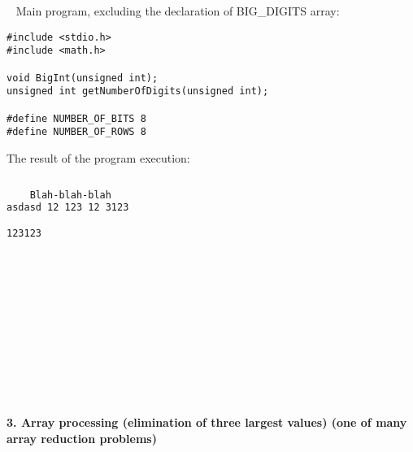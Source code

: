 \documentclass{article}
\begin{document}
	\rmfamily\
	\newline
	\noindent Main program, excluding the declaration of BIG_DIGITS array:
	
	\begin{verbatim}
#include <stdio.h>
#include <math.h>

void BigInt(unsigned int);
unsigned int getNumberOfDigits(unsigned int);

#define NUMBER_OF_BITS 8
#define NUMBER_OF_ROWS 8
	\end{verbatim}
	
	
	\noindent The result of the program execution:
	
	\begin{lstlisting}[basicstyle=\fontsize{7}{9}\ttfamily, language=bash]%[basicstyle=\tiny, %or \small or \footnotesize etc.]
	
	Blah-blah-blah
asdasd 12 123 12 3123 

123123

	\end{lstlisting}
	
	
\paragraph{}\
\paragraph{}\
\paragraph{}\
\paragraph{}\
\paragraph{}\


	
	\rmfamily
	
	\paragraph{3. Array processing (elimination of three largest values) (one of many array reduction problems) }\
	
	\rmfamily\
	
\end{document}
